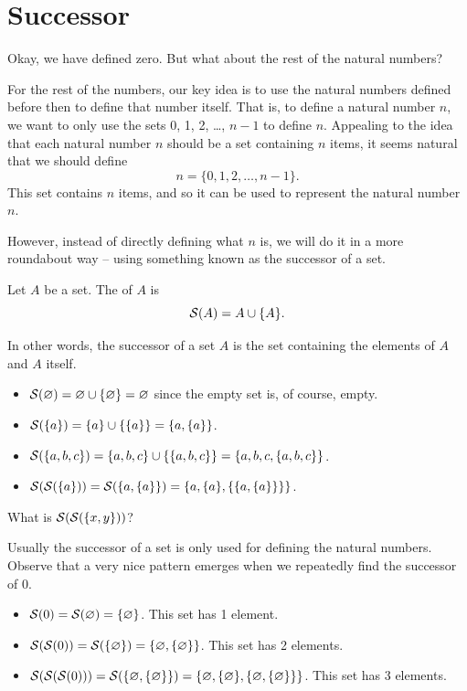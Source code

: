 \section{Successor}
Okay, we have defined zero. But what about the rest of the natural numbers?

For the rest of the numbers, our key idea is to use the natural numbers defined before then to define that number itself. That is, to define a natural number $n$, we want to only use the sets 0, 1, 2, \dots, $n-1$ to define $n$. Appealing to the idea that each natural number $n$ should be a set containing $n$ items, it seems natural that we should define
\[
    n = \{0, 1, 2, \dots, n-1\}.
\]
This set contains $n$ items, and so it can be used to represent the natural number $n$.

However, instead of directly defining what $n$ is, we will do it in a more roundabout way -- using something known as the successor of a set.

\begin{definition}[Successor]
    Let $A$ be a set. The  of $A$ is
    \[
        {\mathcal{S}(A)} = A \cup \{A\}.
    \]
\end{definition}
In other words, the successor of a set $A$ is the set containing the elements of $A$ and $A$ itself.

\begin{example}[Successor]
    \begin{itemize}[leftmargin=*]
        \item ${\mathcal{S}(\varnothing)} = \varnothing \cup \{\varnothing\} = \varnothing$ since the empty set is, of course, empty.
        \item ${\mathcal{S}(\{a\})} = \{a\} \cup \{\{a\}\} = \{a, \{a\}\}$.
        \item ${\mathcal{S}(\{a, b, c\})} = \{a, b, c\} \cup \{\{a, b, c\}\} = \{a, b, c, \{a, b, c\}\}$.
        \item ${\mathcal{S}({\mathcal{S}(\{a\})})} = {\mathcal{S}(\{a, \{a\}\})} = \{a, \{a\}, \{\{a, \{a\}\}\}\}$.
    \end{itemize}
\end{example}

\begin{exercise}
    What is ${\mathcal{S}({\mathcal{S}(\{x, y\})})}$?
\end{exercise}

Usually the successor of a set is only used for defining the natural numbers. Observe that a very nice pattern emerges when we repeatedly find the successor of 0.
\begin{itemize}
    \item ${\mathcal{S}(0)} = {\mathcal{S}(\varnothing)} = \{\varnothing\}$. This set has 1 element.
    \item ${\mathcal{S}({\mathcal{S}(0)})} = {\mathcal{S}(\{\varnothing\})} = \{\varnothing, \{\varnothing\}\}$. This set has 2 elements.
    \item ${\mathcal{S}({\mathcal{S}({\mathcal{S}(0)})})} = {\mathcal{S}(\{\varnothing, \{\varnothing\}\})} = \{\varnothing, \{\varnothing\}, \{\varnothing, \{\varnothing\}\}\}$. This set has 3 elements.
\end{itemize}

